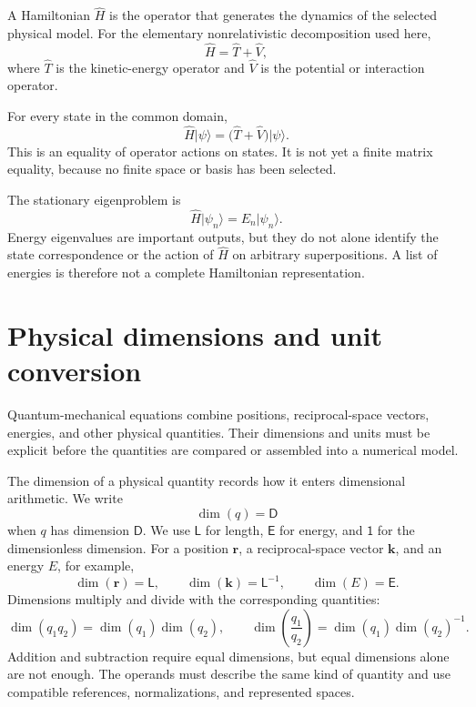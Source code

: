 \begin{definition}[Hamiltonian]
A Hamiltonian \(\hat H\) is the operator that generates the dynamics of the
selected physical model. For the elementary nonrelativistic decomposition used
here,
\begin{equation}
  \hat H=\hat T+\hat V,
\end{equation}
where \(\hat T\) is the kinetic-energy operator and \(\hat V\) is the potential
or interaction operator.
\end{definition}

For every state in the common domain,
\begin{equation}
  \hat H\lvert\psi\rangle
  =\bigl(\hat T+\hat V\bigr)\lvert\psi\rangle.
\end{equation}
This is an equality of operator actions on states. It is not yet a finite matrix
equality, because no finite space or basis has been selected.

The stationary eigenproblem is
\begin{equation}
  \hat H\lvert\psi_n\rangle
  =E_n\lvert\psi_n\rangle.
\end{equation}
Energy eigenvalues are important outputs, but they do not alone identify the
state correspondence or the action of \(\hat H\) on arbitrary superpositions.
A list of energies is therefore not a complete Hamiltonian representation.

\section{Physical dimensions and unit conversion}

Quantum-mechanical equations combine positions, reciprocal-space vectors,
energies, and other physical quantities. Their dimensions and units must be
explicit before the quantities are compared or assembled into a numerical
model.

The dimension of a physical quantity records how it enters dimensional
arithmetic. We write
\begin{equation}
  \dim(q)=\mathsf D
\end{equation}
when \(q\) has dimension \(\mathsf D\). We use \(\mathsf L\) for length,
\(\mathsf E\) for energy, and \(\mathsf 1\) for the dimensionless dimension.
For a position \(\mathbf r\), a reciprocal-space vector \(\mathbf k\), and an
energy \(E\), for example,
\begin{equation}
  \dim(\mathbf r)=\mathsf L,
  \qquad
  \dim(\mathbf k)=\mathsf L^{-1},
  \qquad
  \dim(E)=\mathsf E.
\end{equation}
Dimensions multiply and divide with the corresponding quantities:
\begin{equation}
  \dim(q_1q_2)=\dim(q_1)\dim(q_2),
  \qquad
  \dim\!\left(\frac{q_1}{q_2}\right)
  =\dim(q_1)\dim(q_2)^{-1}.
\end{equation}
Addition and subtraction require equal dimensions, but equal dimensions alone
are not enough. The operands must describe the same kind of quantity and use
compatible references, normalizations, and represented spaces.

